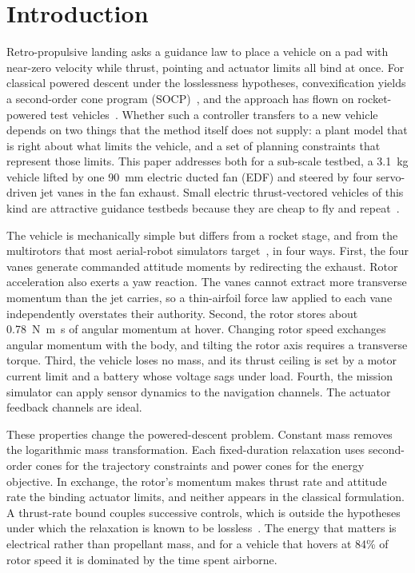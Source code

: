 \documentclass[10pt,letterpaper]{article}
\begin{document}
\section{Introduction}
\label{sec:intro}

Retro-propulsive landing asks a guidance law to place a vehicle on a pad with near-zero velocity while thrust, pointing and actuator limits all bind at once.
For classical powered descent under the losslessness hypotheses, convexification yields a second-order cone program (SOCP)~\cite{acikmese2007,acikmese2013lcvx,blackmore2016}, and the approach has flown on rocket-powered test vehicles~\cite{scharf2017}.
Whether such a controller transfers to a new vehicle depends on two things that the method itself does not supply: a plant model that is right about what limits the vehicle, and a set of planning constraints that represent those limits.
This paper addresses both for a sub-scale testbed, a \SI{3.1}{\kilogram} vehicle lifted by one \SI{90}{\milli\metre} electric ducted fan (EDF) and steered by four servo-driven jet vanes in the fan exhaust.
Small electric thrust-vectored vehicles of this kind are attractive guidance testbeds because they are cheap to fly and repeat~\cite{linsen2022}.

The vehicle is mechanically simple but differs from a rocket stage, and from the multirotors that most aerial-robot simulators target~\cite{furrer2016rotors,song2020flightmare,shah2018airsim,panerati2021gym}, in four ways.
First, the four vanes generate commanded attitude moments by redirecting the exhaust. Rotor acceleration also exerts a yaw reaction.
The vanes cannot extract more transverse momentum than the jet carries, so a thin-airfoil force law applied to each vane independently overstates their authority.
Second, the rotor stores about \SI{0.78}{\newton\metre\second} of angular momentum at hover.
Changing rotor speed exchanges angular momentum with the body, and tilting the rotor axis requires a transverse torque.
Third, the vehicle loses no mass, and its thrust ceiling is set by a motor current limit and a battery whose voltage sags under load.
Fourth, the mission simulator can apply sensor dynamics to the navigation channels. The actuator feedback channels are ideal.

These properties change the powered-descent problem.
Constant mass removes the logarithmic mass transformation. Each fixed-duration relaxation uses second-order cones for the trajectory constraints and power cones for the energy objective.
In exchange, the rotor's momentum makes thrust rate and attitude rate the binding actuator limits, and neither appears in the classical formulation.
A thrust-rate bound couples successive controls, which is outside the hypotheses under which the relaxation is known to be lossless~\cite{acikmese2011lcvx,harris2014lcvx}.
The energy that matters is electrical rather than propellant mass, and for a vehicle that hovers at 84\% of rotor speed it is dominated by the time spent airborne.
\end{document}
